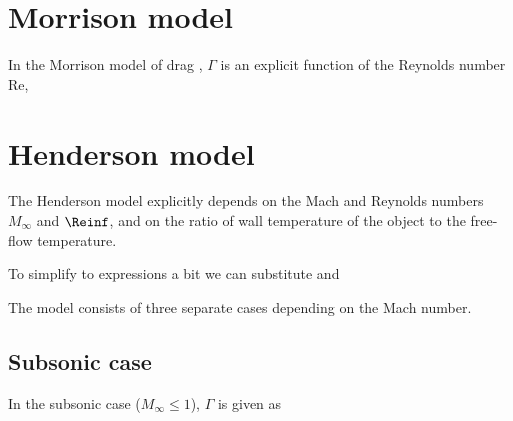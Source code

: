 \section{Morrison model} \label{DM}
    In the Morrison model of drag \citep{morrison2016}, $\Gamma$ is an explicit function
    of the Reynolds number $\mathrm{Re}$,

\section{Henderson model} \label{DH}
    The Henderson model \citep{henderson1976} explicitly depends on the Mach
    and Reynolds numbers $M_\infty$ and $\Reinf$,
    and on the ratio of wall temperature of the object to the free-flow temperature.

    To simplify to expressions a bit we can substitute
    and

    The model consists of three separate cases depending on the Mach number.

    \subsection{Subsonic case}
        In the subsonic case ($M_\infty \leq 1$), $\Gamma$ is given as

